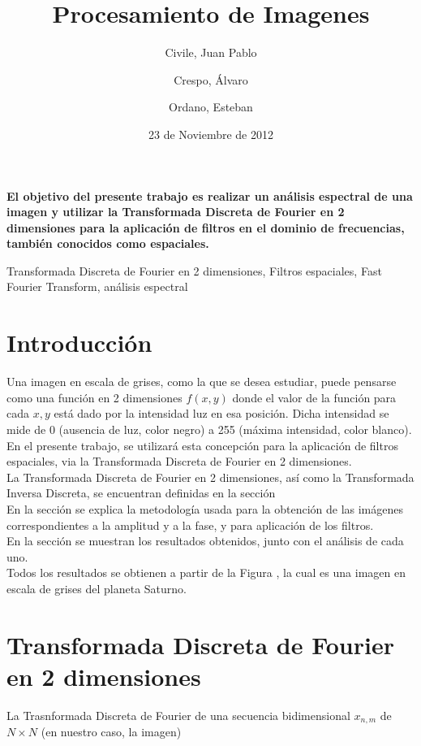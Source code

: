 \documentclass[twocolumn,a4paper,10pt]{article}
\title{Procesamiento de Imagenes}
\date{23 de Noviembre de 2012}
\author{Civile, Juan Pablo \and Crespo, Álvaro \and Ordano, Esteban }
\begin{document}
\pagestyle{fancy}
\maketitle
\thispagestyle{fancy}

\begin{customabstract}
\textbf{
El objetivo del presente trabajo es realizar un an\'alisis espectral de una imagen y utilizar la Transformada Discreta de Fourier en 2 dimensiones para 
la aplicaci\'on de filtros en el dominio de frecuencias, también conocidos como espaciales.
}
\end{customabstract}

\begin{keywords}
Transformada Discreta de Fourier en 2 dimensiones, Filtros espaciales, Fast Fourier Transform, an\'alisis espectral
\end{keywords}

\section{Introducci\'on}

Una imagen en escala de grises, como la que se desea estudiar, puede pensarse como una funci\'on en 2 dimensiones $f(x,y)$ donde el valor de la función
para cada $x,y$ está dado por la intensidad luz en esa posici\'on. Dicha intensidad se mide de 0 (ausencia de luz, color negro) a 255 (m\'axima intensidad, 
color blanco). En el presente trabajo, se utilizará esta concepci\'on para la aplicaci\'on de filtros espaciales, via la 
Transformada Discreta de Fourier en 2 dimensiones. \\

La Transformada Discreta de Fourier en 2 dimensiones, así como la Transformada Inversa Discreta, se encuentran definidas en la secci\'on \\
En la secci\'on 
se explica la metodología usada para la obtenci\'on de las im\'agenes correspondientes a la amplitud y a la fase, y para aplicaci\'on de los filtros. \\
En la secci\'on 
se muestran los resultados obtenidos, junto con el an\'alisis de cada uno. \\
Todos los resultados se obtienen a partir de la Figura
, la cual es una imagen en escala de grises del planeta Saturno. \\

\section{Transformada Discreta de Fourier en 2 dimensiones}
La Trasnformada Discreta de Fourier de una secuencia bidimensional $x_{n,m}$ de $N \times N$ (en nuestro caso, la imagen)
\end{document}
